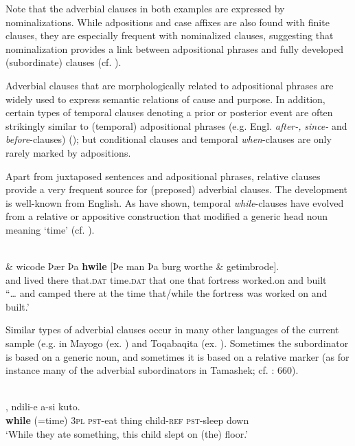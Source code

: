 \documentclass[output=paper]{langsci/langscibook}
\begin{document}
Note that the adverbial clauses in both examples are expressed by nominalizations. While adpositions and case affixes are also found with finite clauses, they are especially frequent with nominalized clauses, suggesting that nominalization provides a link between adpositional phrases and fully developed (subordinate) clauses (cf. \citealt{Deutscher2009,Heine2009}).

Adverbial clauses that are morphologically related to adpositional phrases are widely used to express semantic relations of cause and purpose. In addition, certain types of temporal clauses denoting a prior or posterior event are often strikingly similar to (temporal) adpositional phrases (e.g. Engl. \textit{after-,} \textit{since-} and \textit{before}-clauses) (\citealt{Blake1999,Hetterle2015}); but conditional clauses and temporal \textit{when}-clauses are only rarely marked by adpositions. 

Apart from juxtaposed sentences and adpositional phrases, relative clauses provide a very frequent source for (preposed) adverbial clauses. The development is well-known from English. As \citet{HopperTraugott2003} have shown, temporal \textit{while}-clauses have evolved from a relative or appositive construction that modified a generic head noun meaning ‘time’ (cf. ).

\ea\label{ex:diessel:9}
\\
\gll   \& wicode    Þær   Þa   \textbf{hwile}  [Þe   man  Þa   burg  worthe  \& getimbrode].\\
       and  lived   there   that.\textsc{dat}   time.\textsc{dat}  that   one  that   fortress  worked.on  and built\\
\glt “… and camped there at the time that/while the fortress was worked on and built.'
\z

Similar types of adverbial clauses occur in many other languages of the current sample (e.g. in Mayogo (ex. ) and Toqabaqita (ex. ). Sometimes the subordinator is based on a generic noun, and sometimes it is based on a relative marker (as for instance many of the adverbial subordinators in Tamashek; cf. \citealt{Heath2005}: 660). 

\ea\label{ex:diessel:10}
\\
,   ndili-e   a-si   kuto.\\
        \textbf{while} (=time)  \textsc{3pl}   \textsc{pst-}eat   thing   child-\textsc{ref}   \textsc{pst-}sleep   down\\
\glt   `While they ate something, this child slept on (the) floor.'
\z
\end{document}
